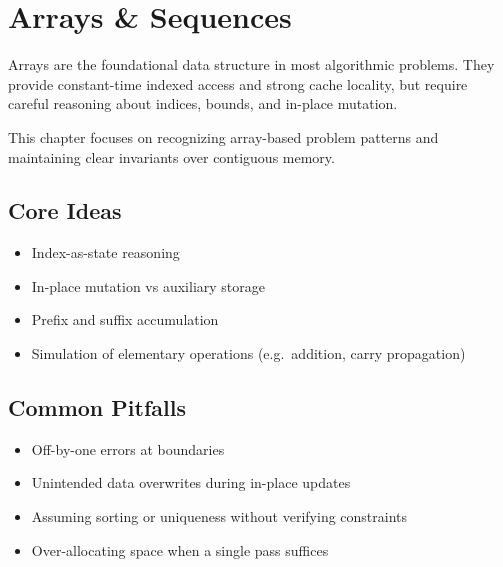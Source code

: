 \section{Arrays \& Sequences}

Arrays are the foundational data structure in most algorithmic problems.
They provide constant-time indexed access and strong cache locality, but
require careful reasoning about indices, bounds, and in-place mutation.

This chapter focuses on recognizing array-based problem patterns and
maintaining clear invariants over contiguous memory.

\subsection{Core Ideas}
\begin{itemize}[nosep]
  \item Index-as-state reasoning
  \item In-place mutation vs auxiliary storage
  \item Prefix and suffix accumulation
  \item Simulation of elementary operations (e.g.\ addition, carry propagation)
\end{itemize}

\subsection{Common Pitfalls}
\begin{itemize}[nosep]
  \item Off-by-one errors at boundaries
  \item Unintended data overwrites during in-place updates
  \item Assuming sorting or uniqueness without verifying constraints
  \item Over-allocating space when a single pass suffices
\end{itemize}






